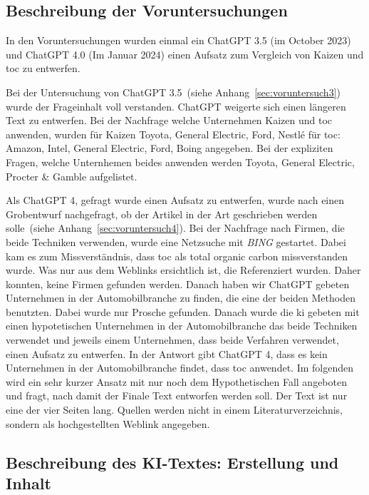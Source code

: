 
\subsection{Beschreibung der Voruntersuchungen}

In den Voruntersuchungen wurden einmal ein ChatGPT 3.5 (im October 2023) und ChatGPT 4.0 (Im Januar 2024)
einen Aufsatz zum Vergleich von Kaizen und \gls{toc} zu entwerfen.

Bei der Untersuchung von ChatGPT 3.5~(siehe Anhang~\ref{sec:voruntersuch3}) wurde der Frageinhalt voll verstanden. ChatGPT weigerte sich einen längeren Text zu entwerfen.
Bei der Nachfrage welche Unternehmen Kaizen und \gls{toc} anwenden, wurden für Kaizen Toyota, General Electric, Ford, Nestlé  für \gls{toc}: Amazon, Intel, General Electric, Ford, Boing angegeben. Bei der expliziten Fragen, welche Unternhemen beides anwenden werden Toyota, General Electric, Procter \& Gamble aufgelistet.

Als ChatGPT 4, gefragt wurde einen Aufsatz zu entwerfen, wurde nach einen Grobentwurf nachgefragt, ob der Artikel in der Art geschrieben werden solle~(siehe Anhang~\ref{sec:voruntersuch4}). Bei der Nachfrage nach Firmen, die beide Techniken verwenden, wurde eine Netzsuche mit \textit{BING} gestartet. Dabei kam es zum Missverständnis, dass \gls{toc} als total organic carbon missverstanden wurde. Was nur aus dem Weblinks ersichtlich ist, die Referenziert wurden. Daher konnten, keine Firmen gefunden werden. Danach haben wir ChatGPT gebeten Unternehmen in der Automobilbranche zu finden, die eine der beiden Methoden benutzten. Dabei wurde nur Prosche gefunden. Danach wurde die \gls{ki} gebeten mit einen hypotetischen Unternehmen in der Automobilbranche das beide Techniken verwendet und jeweils einem Unternehmen, dass beide Verfahren verwendet, einen Aufsatz zu entwerfen. In der Antwort gibt ChatGPT 4, dass es kein Unternehmen in der Automobilbranche findet, dass \gls{toc} anwendet. Im folgenden wird ein sehr kurzer Ansatz mit nur noch dem Hypothetischen Fall angeboten und fragt, nach damit der Finale Text entworfen werden soll. Der Text ist nur eine der vier Seiten lang. Quellen werden nicht in einem Literaturverzeichnis, sondern als hochgestellten Weblink angegeben.

\subsection{Beschreibung des KI-Textes: Erstellung und Inhalt}

